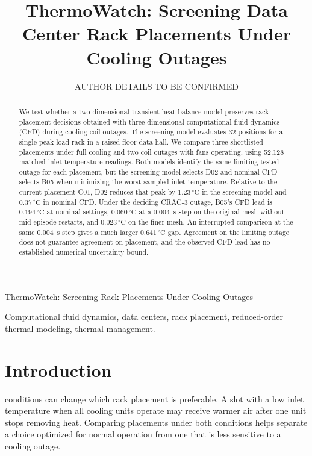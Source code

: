 \documentclass{ieeeaccess}
\begin{document}
\vol{--}
\year{--}

\title{ThermoWatch: Screening Data Center Rack Placements Under Cooling Outages}

\author{\uppercase{Author details to be confirmed}}
\address[1]{Affiliation to be confirmed}
         {ThermoWatch: Screening Rack Placements Under Cooling Outages}

\begin{abstract}
We test whether a two-dimensional transient heat-balance model preserves rack-placement decisions obtained with three-dimensional computational fluid dynamics (CFD) during cooling-coil outages. The screening model evaluates 32 positions for a single peak-load rack in a raised-floor data hall. We compare three shortlisted placements under full cooling and two coil outages with fans operating, using 52,128 matched inlet-temperature readings. Both models identify the same limiting tested outage for each placement, but the screening model selects D02 and nominal CFD selects B05 when minimizing the worst sampled inlet temperature. Relative to the current placement C01, D02 reduces that peak by $1.23\,^{\circ}\mathrm{C}$ in the screening model and $0.37\,^{\circ}\mathrm{C}$ in nominal CFD. Under the deciding CRAC-3 outage, B05's CFD lead is $0.194\,^{\circ}\mathrm{C}$ at nominal settings, $0.060\,^{\circ}\mathrm{C}$ at a 0.004~s step on the original mesh without mid-episode restarts, and $0.023\,^{\circ}\mathrm{C}$ on the finer mesh. An interrupted comparison at the same 0.004~s step gives a much larger $0.641\,^{\circ}\mathrm{C}$ gap. Agreement on the limiting outage does not guarantee agreement on placement, and the observed CFD lead has no established numerical uncertainty bound.
\end{abstract}

\begin{keywords}
Computational fluid dynamics, data centers, rack placement, reduced-order thermal modeling, thermal management.
\end{keywords}

\titlepgskip=-21pt
\maketitle

\section{Introduction}
 conditions can change which rack placement is preferable. A slot with a low inlet temperature when all cooling units operate may receive warmer air after one unit stops removing heat. Comparing placements under both conditions helps separate a choice optimized for normal operation from one that is less sensitive to a cooling outage.
\end{document}
